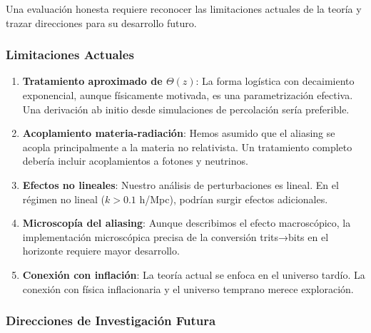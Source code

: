 \documentclass[12pt, a4paper]{article}
\theoremstyle{plain}
\theoremstyle{definition}
\begin{document}
Una evaluación honesta requiere reconocer las limitaciones actuales de la teoría y trazar direcciones para su desarrollo futuro.

\subsubsection{Limitaciones Actuales}

\begin{enumerate}
    \item \textbf{Tratamiento aproximado de $\Theta(z)$}: La forma logística con decaimiento exponencial, aunque físicamente motivada, es una parametrización efectiva. Una derivación ab initio desde simulaciones de percolación sería preferible.
    
    \item \textbf{Acoplamiento materia-radiación}: Hemos asumido que el aliasing se acopla principalmente a la materia no relativista. Un tratamiento completo debería incluir acoplamientos a fotones y neutrinos.
    
    \item \textbf{Efectos no lineales}: Nuestro análisis de perturbaciones es lineal. En el régimen no lineal ($k > 0.1$ h/Mpc), podrían surgir efectos adicionales.
    
    \item \textbf{Microscopía del aliasing}: Aunque describimos el efecto macroscópico, la implementación microscópica precisa de la conversión trits→bits en el horizonte requiere mayor desarrollo.
    
    \item \textbf{Conexión con inflación}: La teoría actual se enfoca en el universo tardío. La conexión con física inflacionaria y el universo temprano merece exploración.
\end{enumerate}

\subsubsection{Direcciones de Investigación Futura}
\end{document}
